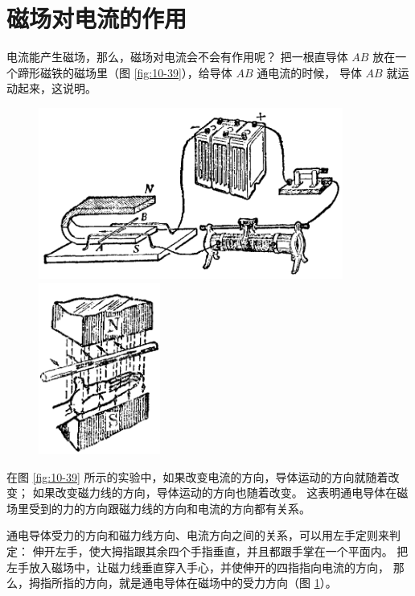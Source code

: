 \section{磁场对电流的作用}\label{sec:10-9}

电流能产生磁场，那么，磁场对电流会不会有作用呢？
把一根直导体 $AB$ 放在一个蹄形磁铁的磁场里（图 \ref{fig:10-39}），给导体 $AB$ 通电流的时候，
导体 $AB$ 就运动起来，这说明。

\begin{figure}[htbp]
    \centering
    \begin{minipage}{10cm}
    \centering
    \includegraphics[width=10cm]{../pic/czwl2-ch10-39}
    \caption{}\label{fig:10-39}
    \end{minipage}
    \qquad
    \begin{minipage}{5cm}
    \centering
    \includegraphics[width=4cm]{../pic/czwl2-ch10-40}
    \caption{}\label{fig:10-40}
    \end{minipage}
\end{figure}


在图 \ref{fig:10-39} 所示的实验中，如果改变电流的方向，导体运动的方向就随着改变；
如果改变磁力线的方向，导体运动的方向也随着改变。
这表明通电导体在磁场里受到的力的方向跟磁力线的方向和电流的方向都有关系。

通电导体受力的方向和磁力线方向、电流方向之间的关系，可以用左手定则来判定：
伸开左手，使大拇指跟其余四个手指垂直，并且都跟手掌在一个平面内。
把左手放入磁场中，让磁力线垂直穿入手心，并使伸开的四指指向电流的方向，
那么，拇指所指的方向，就是通电导体在磁场中的受力方向（图 \ref{fig:10-40}）。


